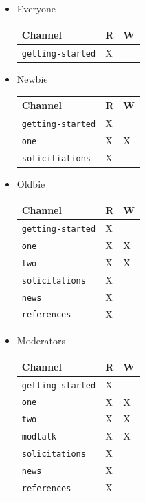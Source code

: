 \documentclass[11pt]{article}
\begin{document}
\begin{itemize}
\item Everyone
\label{sec:org5da7b49}
\begin{center}
\begin{tabular}{lll}
Channel & R & W\\
\hline
\texttt{getting-started} & X & \\
\end{tabular}
\end{center}
\item Newbie
\label{sec:org7f29fd1}
\begin{center}
\begin{tabular}{lll}
Channel & R & W\\
\hline
\texttt{getting-started} & X & \\
\texttt{one} & X & X\\
\texttt{solicitiations} & X & \\
\end{tabular}
\end{center}
\item Oldbie
\label{sec:org8012aaa}
\begin{center}
\begin{tabular}{lll}
Channel & R & W\\
\hline
\texttt{getting-started} & X & \\
\texttt{one} & X & X\\
\texttt{two} & X & X\\
\texttt{solicitations} & X & \\
\texttt{news} & X & \\
\texttt{references} & X & \\
\end{tabular}
\end{center}
\item Moderators
\label{sec:org2eaf4e9}
\begin{center}
\begin{tabular}{lll}
Channel & R & W\\
\hline
\texttt{getting-started} & X & \\
\texttt{one} & X & X\\
\texttt{two} & X & X\\
\texttt{modtalk} & X & X\\
\texttt{solicitations} & X & \\
\texttt{news} & X & \\
\texttt{references} & X & \\
\end{tabular}
\end{center}
\end{itemize}
\stopcontents[level-2]
\end{document}
